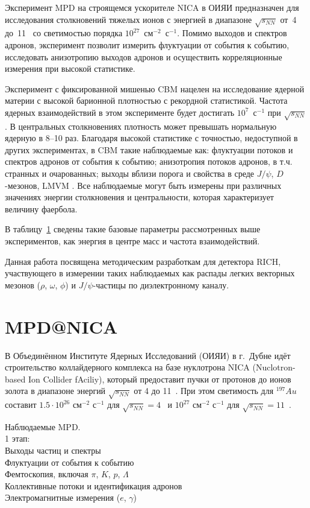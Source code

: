 Эксперимент MPD на строящемся ускорителе NICA в ОИЯИ предназначен для исследования столкновений тяжелых ионов с энергией в диапазоне $\sqrt{s_{NN}}$ от~4 до~11~\GeVperNucl{} со светимостью порядка $10^{27}$~см$^{-2}$~с$^{-1}$. Помимо выходов и спектров адронов, эксперимент позволит измерить флуктуации от события к событию, исследовать анизотропию выходов адронов и осуществить корреляционные измерения при высокой статистике.

Эксперимент с фиксированной мишенью CBM нацелен на исследование ядерной материи с высокой барионной плотностью с рекордной статистикой. Частота ядерных взаимодействий в этом эксперименте будет достигать $10^7$~с$^{-1}$ при $\sqrt{s_{NN}}$ \todo. В центральных столкновениях плотность может превышать нормальную ядерную в 8--10 раз. Благодаря высокой статистике с точностью, недоступной в других экспериментах, в CBM \todo такие наблюдаемые как: флуктуации потоков и спектров адронов от события к событию; анизотропия потоков адронов, в т.ч. странных и очарованных; выходы вблизи порога и свойства в среде $J/\psi$, $D$-мезонов, LMVM \todo. Все наблюдаемые могут быть измерены при различных значениях энергии столкновения и центральности, которая характеризует величину фаербола.

В таблицу~\ref{} сведены такие базовые параметры рассмотренных выше экспериментов, как энергия в центре масс и частота взаимодействий.

Данная работа посвящена методическим разработкам для детектора RICH, участвующего в измерении таких наблюдаемых как распады легких векторных мезонов ($\rho$, $\omega$, $\phi$) и $J/\psi$-частицы по диэлектронному каналу.

\section{MPD@NICA}


В Объединённом Институте Ядерных Исследований (ОИЯИ) в г.~Дубне идёт строительство коллайдерного комплекса на базе нуклотрона NICA (Nuclotron-based Ion Collider fAciliy), который предоставит пучки от протонов до ионов золота в диапазоне энергий $\sqrt{s_{NN}}$ от 4 до 11~\GeVperNucl. При этом светимость для $^{197}Au$ составит $1.5 \cdot 10^{26}$ см$^{-2}$ с$^{-1}$ для $\sqrt{s_{NN}}=4$~\GeVperNucl{} и $10^{27}$ см$^{-2}$ с$^{-1}$ для $\sqrt{s_{NN}}=11$~\GeVperNucl.

Наблюдаемые MPD. \\
1 этап: \\
Выходы частиц и спектры \\
Флуктуации от события к событию \\
Фемтоскопия, включая $\pi$, $K$, $p$, $\Lambda$ \\
Коллективные потоки и идентификация адронов \\
Электромагнитные измерения ($e$, $\gamma$) \\

